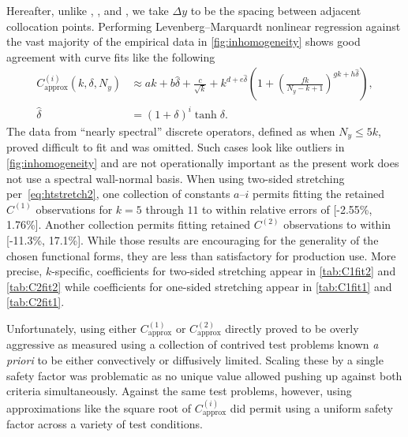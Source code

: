 Hereafter, unlike \citeauthor{Guarini1998}, \citeauthor{Kwok2002}, and
\citeauthor{Venugopal2003}, we take $\Delta{}y$ to be the spacing between
adjacent collocation points.  Performing Levenberg--Marquardt nonlinear
regression against the vast majority of the empirical data in
\autoref{fig:inhomogeneity} shows good agreement with curve fits like the
following
\begin{subequations}
\begin{align}
  \label{eq:Cfit}
  C_\text{approx}^{(i)}\!\left(k,\delta,N_y\right)
  &\approx
    a k
  + b \hat\delta
  + \frac{c}{\sqrt{k}}
  + k^{d + e \hat\delta} \left(
        1 + \left(\frac{f k}{N_y - k + 1}\right)^{g k + h \hat\delta}
    \right)
  ,
  \\
  \hat\delta &= \left(1+\delta\right)^i \tanh \delta.
\end{align}
\end{subequations}
The data from ``nearly spectral'' discrete operators, defined as when $N_y \leq
5 k$, proved difficult to fit and was omitted.  Such cases look like outliers
in \autoref{fig:inhomogeneity} and are not operationally important as
the present work does not use a spectral wall-normal basis.  When
using two-sided stretching per~\eqref{eq:htstretch2}, one collection of
constants $a$--$i$ permits fitting the retained $C^{(1)}$ observations for
$k=5$ through $11$ to within relative errors of [-2.55\%, 1.76\%].  Another
collection permits fitting retained $C^{(2)}$ observations to within [-11.3\%,
17.1\%].  While those results are encouraging for the generality of the chosen
functional forms, they are less than satisfactory for production use.  More
precise, $k$-specific, coefficients for two-sided stretching appear in
\autoref{tab:C1fit2} and \autoref{tab:C2fit2} while coefficients for one-sided
stretching appear in \autoref{tab:C1fit1} and \autoref{tab:C2fit1}.

Unfortunately, using either $C_\text{approx}^{(1)}$ or $C_\text{approx}^{(2)}$
directly proved to be overly aggressive as measured using a collection of
contrived test problems known \emph{a priori} to be either convectively or
diffusively limited.  Scaling these by a single safety factor was problematic as no
unique value allowed pushing up against both criteria simultaneously.  Against
the same test problems, however, using approximations like the square root of
$C_\text{approx}^{(i)}$ did permit using a uniform safety factor across a
variety of test conditions.

